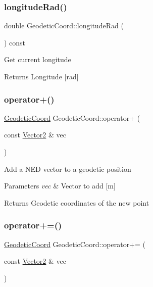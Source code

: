 \subsubsection{\texorpdfstring{longitude\+Rad()}{longitudeRad()}}
{\footnotesize\ttfamily double Geodetic\+Coord\+::longitude\+Rad (\begin{DoxyParamCaption}{ }\end{DoxyParamCaption}) const}

Get current longitude \begin{DoxyReturn}{Returns}
Longitude \mbox{[}rad\mbox{]} 
\end{DoxyReturn}
\mbox{\label{class_m210_1_1_geodetic_coord_a763b712e1d458ba213f03bc4f45c1862}} 
\subsubsection{\texorpdfstring{operator+()}{operator+()}}
{\footnotesize\ttfamily \mbox{\hyperlink{class_m210_1_1_geodetic_coord}{Geodetic\+Coord}} Geodetic\+Coord\+::operator+ (\begin{DoxyParamCaption}\item[{const \mbox{\hyperlink{struct_vector2}{Vector2}} \&}]{vec }\end{DoxyParamCaption})}

Add a N\+ED vector to a geodetic position 
\begin{DoxyParams}{Parameters}
{\em vec} & Vector to add \mbox{[}m\mbox{]} \\
\hline
\end{DoxyParams}
\begin{DoxyReturn}{Returns}
Geodetic coordinates of the new point 
\end{DoxyReturn}
\mbox{\label{class_m210_1_1_geodetic_coord_acf1d0b551179adc795b70a6d17d16fe2}} 
\subsubsection{\texorpdfstring{operator+=()}{operator+=()}}
{\footnotesize\ttfamily \mbox{\hyperlink{class_m210_1_1_geodetic_coord}{Geodetic\+Coord}} Geodetic\+Coord\+::operator+= (\begin{DoxyParamCaption}\item[{const \mbox{\hyperlink{struct_vector2}{Vector2}} \&}]{vec }\end{DoxyParamCaption})}

